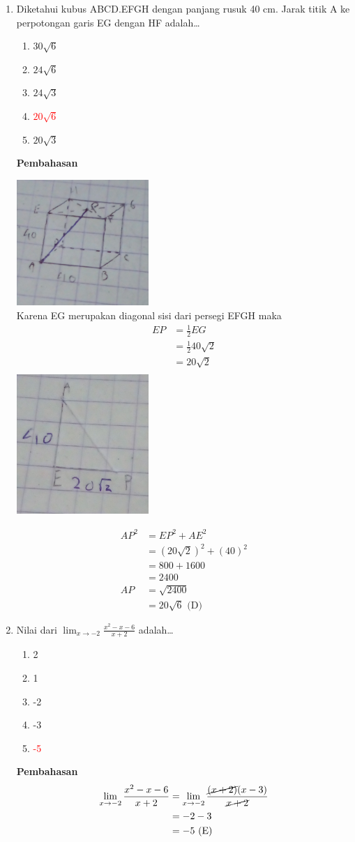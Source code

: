 \documentclass{report}
\newcommand{\options}[5]{
\begin{enumerate}[label=\alph*.]
	\item #1
	\item #2
	\item #3
	\item #4
	\item #5
\end{enumerate}
}
\newcommand{\pemb}{ \textbf{Pembahasan} \\}
\begin{document}
\begin{enumerate}
\item Diketahui kubus ABCD.EFGH dengan panjang rusuk 40 cm. Jarak titik A ke perpotongan garis EG dengan HF adalah\ldots
\options
{$30\sqrt{6}$}
{$24\sqrt{6}$}
{$24\sqrt{3}$}
{\textcolor{red}{$20\sqrt{6}$}}
{$20\sqrt{3}$}
\pemb
\begin{center}
\includegraphics[valign=c,width=50mm,scale=0.5]{cube_21.jpg}\\
Karena EG merupakan diagonal sisi dari persegi EFGH maka 
	\begin{align*}
		EP &= \frac{1}{2} EG \\
		   &= \frac{1}{2} 40\sqrt{2} \\
		   &= 20\sqrt{2} \\
	\end{align*}
\includegraphics[valign=c,width=50mm,scale=0.5]{seg_21.jpg}\\
\end{center}
\begin{align*}
	AP^2 &= EP^2 + AE^2 \\
	     &= \left(20\sqrt{2}\right)^2 + \left(40\right)^2 \\
	     &= 800 + 1600 \\
	     &= 2400 \\
	  AP &= \sqrt{2400} \\
	     &= 20\sqrt{6} \text{ (D)}
\end{align*}

\item Nilai dari $\lim_{x\to-2}\frac{x^2-x-6}{x+2}$ adalah\ldots
\options
{2}
{1}
{-2}
{-3}
{\textcolor{red}{-5}}
\pemb
\begin{align*}
	\lim_{x\to-2}\frac{x^2-x-6}{x+2} &= \lim_{x\to-2}\frac{\cancel{(x+2)}(x-3)}{\cancel{x+2}} \\
	&= -2 -3 \\
	&= -5 \text{ (E)}
\end{align*}


\end{enumerate}
\end{document}
